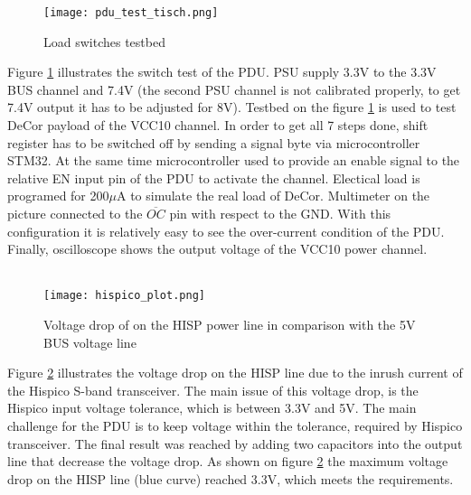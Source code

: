  \begin{figure}[h]
 	\centering
 	\texttt{[image: pdu\_test\_tisch.png]}
 	\caption{Load switches testbed}
 	\label{fig: pdu_test_tisch}
 \end{figure}

Figure \ref{fig: pdu_test_tisch} illustrates the switch test of the PDU. PSU supply 3.3V to the 3.3V BUS channel and 7.4V (the second PSU channel is not calibrated properly, to get 7.4V output it has to be adjusted for 8V). Testbed on the figure \ref{fig: pdu_test_tisch} is used to test DeCor payload of the VCC10 channel. In order to get all 7 steps done, shift register has to be switched off by sending a signal byte via microcontroller STM32. At the same time microcontroller used to provide an enable signal to the relative EN input pin of the PDU to activate the channel. Electical load is programed for 200$\mu$A to simulate the real load of DeCor. Multimeter on the picture connected to the $\overline{OC}$ pin with respect to the GND. With this configuration it is relatively easy to see the over-current condition of the PDU. Finally, oscilloscope shows the output voltage of the VCC10 power channel.\\ \\


 \begin{figure}[h]
 	\centering
 	\texttt{[image: hispico\_plot.png]}
 	\caption{Voltage drop of on the HISP power line in comparison with the 5V BUS voltage line}
 	\label{fig: oscilloscope}
 \end{figure}

Figure \ref{fig: oscilloscope} illustrates the voltage drop on the HISP line due to the inrush current of the Hispico S-band transceiver. The main issue of this voltage drop, is the Hispico input voltage tolerance, which is between 3.3V and 5V. The main challenge for the PDU is to keep voltage within the tolerance, required by Hispico transceiver. The final result was reached by adding two capacitors into the output line that decrease the voltage drop. As shown on figure \ref{fig: oscilloscope} the maximum voltage drop on the HISP line (blue curve) reached 3.3V, which meets the requirements.

	
	
	
		\caption{Load switch test results}

			
			

